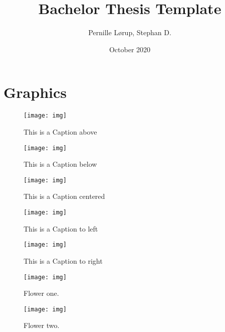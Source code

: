 \documentclass[12pt]{article}
\title{Bachelor Thesis Template}
\author{Pernille Lørup, Stephan D.}
\date{October 2020}
\begin{document}
\clearpage\maketitle
\thispagestyle{empty}

\pagebreak
\tableofcontents

\section{Graphics}


\begin{figure}[H]
  \caption{This is a Caption above \label{figure:cap-above}}
  \texttt{[image: img]}
\end{figure}

\begin{figure}[H]
  \texttt{[image: img]}
  \caption{This is a Caption below  \label{figure:cap-below}}
\end{figure}

\begin{figure}[H]
    \captionsetup{justification=centering}
    \texttt{[image: img]}
    \caption{This is a Caption centered  \label{figure:cap-center}}
\end{figure}

\begin{figure}[H]
    \captionsetup{justification=raggedright,singlelinecheck=false}
    \texttt{[image: img]}
    \caption{This is a Caption to left  \label{figure:cap-left}}
\end{figure}

\begin{figure}[H]
    \captionsetup{justification=raggedleft,singlelinecheck=false}
    \texttt{[image: img]}
    \caption{This is a Caption to right  \label{figure:cap-right}}
\end{figure}

\begin{figure}[H]
  \centering
  \begin{minipage}[b]{0.4\textwidth}
    \texttt{[image: img]}
    \caption{Flower one.}
  \end{minipage}
  \hfill
  \begin{minipage}[b]{0.4\textwidth}
    \texttt{[image: img]}
    \caption{Flower two.}
  \end{minipage}
  \label{figure:two-beside}
\end{figure}
\end{document}
